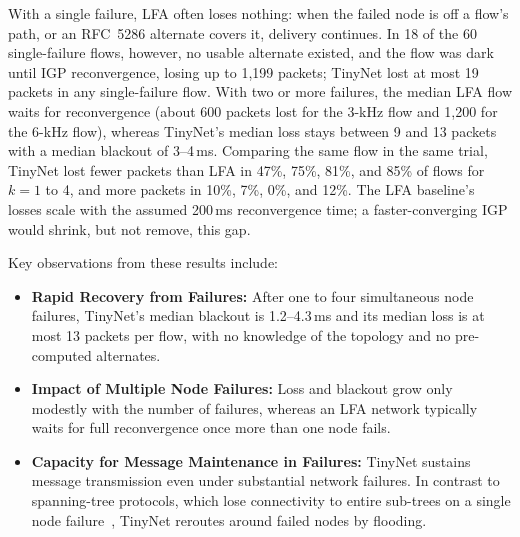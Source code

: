 With a single failure, LFA often loses nothing: when the failed node is off a flow's path, or an RFC~5286 alternate covers it, delivery continues. In 18 of the 60 single-failure flows, however, no usable alternate existed, and the flow was dark until IGP reconvergence, losing up to 1{,}199 packets; TinyNet lost at most 19 packets in any single-failure flow. With two or more failures, the median LFA flow waits for reconvergence (about 600 packets lost for the 3-kHz flow and 1{,}200 for the 6-kHz flow), whereas TinyNet's median loss stays between 9 and 13 packets with a median blackout of 3--4\,ms. Comparing the same flow in the same trial, TinyNet lost fewer packets than LFA in 47\%, 75\%, 81\%, and 85\% of flows for $k = 1$ to 4, and more packets in 10\%, 7\%, 0\%, and 12\%. The LFA baseline's losses scale with the assumed 200\,ms reconvergence time; a faster-converging IGP would shrink, but not remove, this gap.

Key observations from these results include:
\begin{itemize}
    \item \textbf{Rapid Recovery from Failures:} After one to four simultaneous node failures, TinyNet's median blackout is 1.2--4.3\,ms and its median loss is at most 13 packets per flow, with no knowledge of the topology and no pre-computed alternates.
    \item \textbf{Impact of Multiple Node Failures:} Loss and blackout grow only modestly with the number of failures, whereas an LFA network typically waits for full reconvergence once more than one node fails.
    \item \textbf{Capacity for Message Maintenance in Failures:} TinyNet sustains message transmission even under substantial network failures. In contrast to spanning-tree protocols, which lose connectivity to entire sub-trees on a single node failure~\cite{spb}, TinyNet reroutes around failed nodes by flooding.
\end{itemize}
